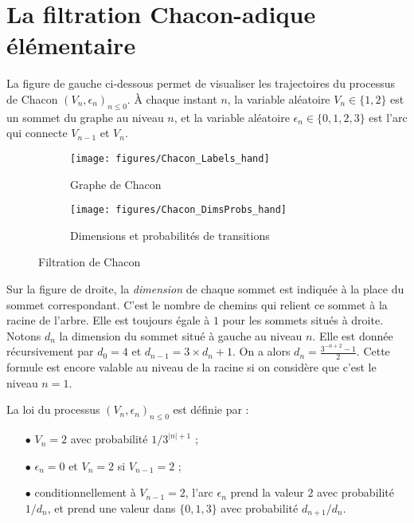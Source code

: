 \documentclass[12pt,a4paper]{article}
\begin{document}
\section{La filtration Chacon-adique élémentaire}

La figure de gauche ci-dessous permet de visualiser 
les trajectoires du processus de Chacon 
${(V_n, \epsilon_n)}_{n \leq 0}$.   
À chaque instant $n$, la variable aléatoire $V_n \in \{1,2\}$ est un sommet 
du graphe au niveau $n$, et la variable aléatoire $\epsilon_n \in \{0, 1, 2, 3\}$ 
est l'arc qui connecte $V_{n-1}$ et $V_n$. 

\begin{figure}[!h]
   \centering
   \begin{subfigure}[t]{0.47\textwidth}
   \centering
   	\texttt{[image: figures/Chacon\_Labels\_hand]}
 		\caption{\footnotesize Graphe de Chacon}\label{fig:ChaconLabels}
    \end{subfigure}              
   \quad
    \begin{subfigure}[t]{0.47\textwidth}
    \centering
   	\texttt{[image: figures/Chacon\_DimsProbs\_hand]}
 		\caption{\footnotesize Dimensions et probabilités de transitions}\label{fig:ChaconDimsProbs}
 	\end{subfigure}      

   \caption{Filtration de Chacon}\label{fig:ChaconGraph}
   \label{fig:ostro}
 \end{figure}

Sur la figure de droite, la \emph{dimension} de chaque sommet est indiquée à la place 
du sommet correspondant. C'est le nombre de chemins qui relient ce sommet à la racine 
de l'arbre. Elle est toujours égale à $1$ pour les sommets situés à droite. 
Notons $d_n$ la dimension du sommet situé à gauche au niveau $n$. 
Elle est donnée récursivement par $d_0=4$ et $d_{n-1} = 3 \times d_n+1$. 
On a alors $d_n=\frac{3^{-n+2}-1}{2}$. Cette formule est encore 
valable au niveau de la racine si on considère que c'est le niveau $n=1$. 

La loi du processus ${(V_n, \epsilon_n)}_{n \leq 0}$ est définie par :

\begin{itemize}
\item[$\bullet$] $V_n = 2$ avec probabilité $1/3^{|n|+1}$ ;

\item[$\bullet$] $\epsilon_n=0$ et $V_n=2$ si $V_{n-1}=2$ ;

\item[$\bullet$] conditionnellement à $V_{n-1}=2$, l'arc $\epsilon_n$ prend la 
valeur $2$ avec probabilité $1/d_{n}$, et prend une valeur dans 
$\{0,1,3\}$ avec probabilité $d_{n+1}/d_n$. 
\end{itemize}
\end{document}
